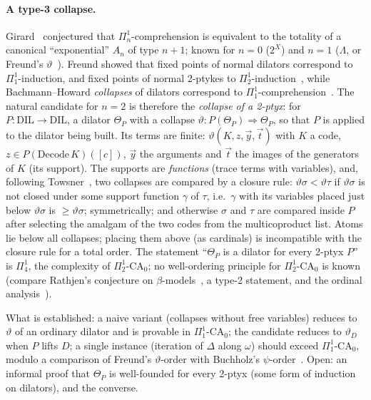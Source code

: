 \documentclass[11pt]{article}
\theoremstyle{definition}
\theoremstyle{remark}
\begin{document}
\paragraph{A type-3 collapse.} Girard~\cite{GirH} conjectured that
$\Pi^1_n$-comprehension is equivalent to the totality of a canonical
``exponential'' $A_n$ of type $n+1$; known for $n=0$ ($2^X$) and $n=1$
($\Lambda$, or Freund's $\vartheta$~\cite{Fre19,AFW}). Freund showed that
fixed points of normal dilators correspond to $\Pi^1_1$-induction, and fixed
points of normal 2-ptykes to $\Pi^1_2$-induction~\cite{FrePilot}, while
Bachmann--Howard \emph{collapses} of dilators correspond to
$\Pi^1_1$-comprehension~\cite{Fre19}. The
natural candidate for $n=2$ is therefore the \emph{collapse of a 2-ptyx}:
for $P:\mathrm{DIL}\to\mathrm{DIL}$, a dilator $\Theta_P$ with a collapse
$\vartheta:P(\Theta_P)\Rightarrow\Theta_P$, so that $P$ is applied to the
dilator being built. Its terms are finite: $\vartheta(K,z,\vec y,\vec t)$
with $K$ a code, $z\in P(\mathrm{Decode}\,K)([c])$, $\vec y$ the arguments
and $\vec t$ the images of the generators of $K$ (its support). The
supports are \emph{functions} (trace terms with variables), and, following
Towsner~\cite{TowPoly}, two collapses are compared by a closure rule:
$\vartheta\sigma<\vartheta\tau$ if $\vartheta\sigma$ is not closed under
some support function $\gamma$ of $\tau$, i.e.\ $\gamma$ with its variables
placed just below $\vartheta\sigma$ is $\ge\vartheta\sigma$; symmetrically;
and otherwise $\sigma$ and $\tau$ are compared inside $P$ after selecting
the amalgam of the two codes from the multicoproduct list. Atoms lie below
all collapses; placing them above (as cardinals) is incompatible with the
closure rule for a total order. The
statement ``$\Theta_P$ is a dilator for every 2-ptyx $P$'' is $\Pi^1_4$,
the complexity of $\Pi^1_2$-$\mathrm{CA}_0$; no well-ordering principle for
$\Pi^1_2$-$\mathrm{CA}_0$ is known (compare Rathjen's conjecture on
$\beta$-models~\cite[Conj.~6.6]{Rat21}, a type-2 statement, and the ordinal
analysis~\cite{Rat05}).

What is established: a naive variant (collapses without free variables)
reduces to $\vartheta$ of an ordinary dilator and is provable in
$\Pi^1_1$-$\mathrm{CA}_0$; the candidate reduces to $\vartheta_D$ when $P$
lifts $D$; a single instance (iteration of $\Delta$ along $\omega$) should
exceed $\Pi^1_1$-$\mathrm{CA}_0$, modulo a comparison of Freund's
$\vartheta$-order with Buchholz's $\psi$-order~\cite{Buc86}.  Open: an informal proof
that $\Theta_P$ is well-founded for every 2-ptyx (some form of induction on
dilators), and the converse.
\end{document}
